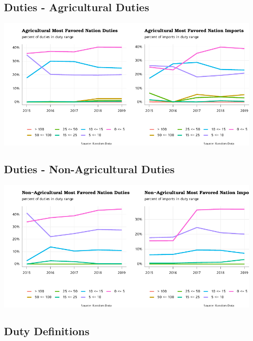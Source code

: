\documentclass[
]{article}
\begin{document}
\hypertarget{duties---agricultural-duties}{%
\subsection{Duties - Agricultural
Duties}\label{duties---agricultural-duties}}

\begin{center}\includegraphics{RandomData_MCD__files/figure-latex/agricultureal_duties-1} \end{center}

\hypertarget{duties---non-agricultural-duties}{%
\subsection{Duties - Non-Agricultural
Duties}\label{duties---non-agricultural-duties}}

\begin{center}\includegraphics{RandomData_MCD__files/figure-latex/non-agricultureal_duties-1} \end{center}
\newpage

\hypertarget{duty-definitions}{%
\subsection{Duty Definitions}\label{duty-definitions}}
\end{document}
